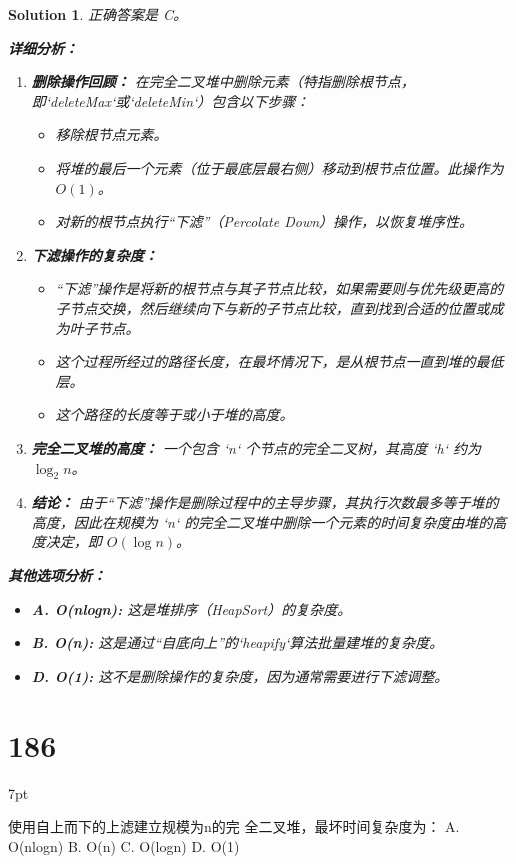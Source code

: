 \documentclass[UTF8]{report}
\newtheorem{solution}{Solution}
\theoremstyle{MyLineTheoremStyle} %
\theoremstyle{MyBlockTheoremStyle} %
\theoremstyle{MySubsubsectionStyle} %
\newenvironment{graybox}{%
        \def\FrameCommand{%
        \hspace{1pt}%
        {\color{gray}\small \vrule width 2pt}%
        {\color{graybox_color}\vrule width 4pt}%
        \colorbox{graybox_color}%
        }%
        \MakeFramed{\advance\hsize-\width\FrameRestore}%
        \noindent\hspace{-4.55pt}%
        \begin{adjustwidth}{}{7pt}%
        \vspace{2pt}\vspace{2pt}%
        }
        {%
        \vspace{2pt}\end{adjustwidth}\endMakeFramed%
        }
\begin{document}
\begin{solution}
正确答案是 C。

\textbf{详细分析：}

\begin{enumerate}
    \item \textbf{删除操作回顾：}
    在完全二叉堆中删除元素（特指删除根节点，即`deleteMax`或`deleteMin`）包含以下步骤：
    \begin{itemize}
        \item 移除根节点元素。
        \item 将堆的最后一个元素（位于最底层最右侧）移动到根节点位置。此操作为 $O(1)$。
        \item 对新的根节点执行“下滤”（Percolate Down）操作，以恢复堆序性。
    \end{itemize}

    \item \textbf{下滤操作的复杂度：}
    \begin{itemize}
        \item “下滤”操作是将新的根节点与其子节点比较，如果需要则与优先级更高的子节点交换，然后继续向下与新的子节点比较，直到找到合适的位置或成为叶子节点。
        \item 这个过程所经过的路径长度，在最坏情况下，是从根节点一直到堆的最低层。
        \item 这个路径的长度等于或小于堆的高度。
    \end{itemize}

    \item \textbf{完全二叉堆的高度：}
    一个包含 `n` 个节点的完全二叉树，其高度 `h` 约为 $\log_2 n$。

    \item \textbf{结论：}
    由于“下滤”操作是删除过程中的主导步骤，其执行次数最多等于堆的高度，因此在规模为 `n` 的完全二叉堆中删除一个元素的时间复杂度由堆的高度决定，即 $O(\log n)$。
\end{enumerate}

\textbf{其他选项分析：}
\begin{itemize}
    \item \textbf{A. O(nlogn):} 这是堆排序（HeapSort）的复杂度。
    \item \textbf{B. O(n):} 这是通过“自底向上”的`heapify`算法批量建堆的复杂度。
    \item \textbf{D. O(1):} 这不是删除操作的复杂度，因为通常需要进行下滤调整。
\end{itemize}
\end{solution}

\section*{186}
\begin{graybox}
使用自上而下的上滤建立规模为n的完
全二叉堆，最坏时间复杂度为：
A. O(nlogn)
B. O(n)
C. O(logn)
D. O(1)
\end{graybox}
\end{document}
